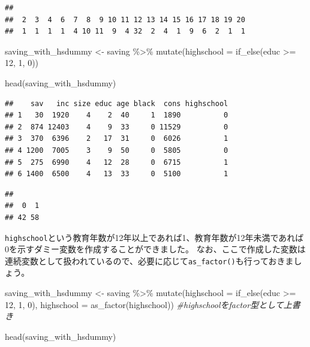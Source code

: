 \documentclass[
]{book}
\newenvironment{Shaded}{\begin{snugshade}}{\end{snugshade}}
\newcommand{\AttributeTok}[1]{\textcolor[rgb]{0.77,0.63,0.00}{#1}}
\newcommand{\CommentTok}[1]{\textcolor[rgb]{0.56,0.35,0.01}{\textit{#1}}}
\newcommand{\DecValTok}[1]{\textcolor[rgb]{0.00,0.00,0.81}{#1}}
\newcommand{\FunctionTok}[1]{\textcolor[rgb]{0.00,0.00,0.00}{#1}}
\newcommand{\NormalTok}[1]{#1}
\newcommand{\OtherTok}[1]{\textcolor[rgb]{0.56,0.35,0.01}{#1}}
\newcommand{\SpecialCharTok}[1]{\textcolor[rgb]{0.00,0.00,0.00}{#1}}
\begin{document}
\begin{verbatim}
## 
##  2  3  4  6  7  8  9 10 11 12 13 14 15 16 17 18 19 20 
##  1  1  1  1  4 10 11  9  4 32  2  4  1  9  6  2  1  1
\end{verbatim}

\begin{Shaded}
\begin{Highlighting}[]
\NormalTok{saving\_with\_hsdummy }\OtherTok{\textless{}{-}}
\NormalTok{  saving }\SpecialCharTok{\%\textgreater{}\%}
    \FunctionTok{mutate}\NormalTok{(}\AttributeTok{highschool =} \FunctionTok{if\_else}\NormalTok{(educ }\SpecialCharTok{\textgreater{}=} \DecValTok{12}\NormalTok{, }\DecValTok{1}\NormalTok{, }\DecValTok{0}\NormalTok{))}

\FunctionTok{head}\NormalTok{(saving\_with\_hsdummy)}
\end{Highlighting}
\end{Shaded}

\begin{verbatim}
##    sav   inc size educ age black  cons highschool
## 1   30  1920    4    2  40     1  1890          0
## 2  874 12403    4    9  33     0 11529          0
## 3  370  6396    2   17  31     0  6026          1
## 4 1200  7005    3    9  50     0  5805          0
## 5  275  6990    4   12  28     0  6715          1
## 6 1400  6500    4   13  33     0  5100          1
\end{verbatim}

\begin{Shaded}
\end{Shaded}

\begin{verbatim}
## 
##  0  1 
## 42 58
\end{verbatim}

\texttt{highschool}という教育年数が12年以上であれば1、教育年数が12年未満であれば0を示すダミー変数を作成することができました。
なお、ここで作成した変数は連続変数として扱われているので、必要に応じて\texttt{as\_factor()}も行っておきましょう。

\begin{Shaded}
\begin{Highlighting}[]
\NormalTok{saving\_with\_hsdummy }\OtherTok{\textless{}{-}}
\NormalTok{  saving }\SpecialCharTok{\%\textgreater{}\%}
    \FunctionTok{mutate}\NormalTok{(}\AttributeTok{highschool =} \FunctionTok{if\_else}\NormalTok{(educ }\SpecialCharTok{\textgreater{}=} \DecValTok{12}\NormalTok{, }\DecValTok{1}\NormalTok{, }\DecValTok{0}\NormalTok{),}
           \AttributeTok{highschool =} \FunctionTok{as\_factor}\NormalTok{(highschool)) }\CommentTok{\#highschoolをfactor型として上書き}

\FunctionTok{head}\NormalTok{(saving\_with\_hsdummy)}
\end{Highlighting}
\end{Shaded}
\end{document}
